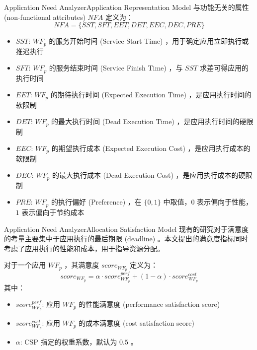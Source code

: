\documentclass[aspectratio=169]{beamer}
\begin{document}
\begin{frame}{Application Need Analyzer}{Application Representation Model}\label{label:non-functional-attributes}
  与功能无关的属性 (non-functional attributes) $NFA$ 定义为：
  \begin{equation*}
    NFA = \{SST, SFT, EET, DET, EEC, DEC, PRE\}
  \end{equation*}
  \begin{itemize}
    \item $SST$: $WF_p$ 的服务开始时间 (Service Start Time) ，用于确定应用立即执行或推迟执行
    \item $SFT$: $WF_p$ 的服务结束时间 (Service Finish Time) ，与 $SST$ 求差可得应用的执行时间
    \item $EET$: $WF_p$ 的期待执行时间 (Expected Execution Time) ，是应用执行时间的软限制
    \item $DET$: $WF_p$ 的最大执行时间 (Dead Execution Time) ，是应用执行时间的硬限制
    \item $EEC$: $WF_p$ 的期望执行成本 (Expected Execution Cost) ，是应用执行成本的软限制
    \item $DEC$: $WF_p$ 的最大执行成本 (Dead Execution Cost) ，是应用执行成本的硬限制
    \item $PRE$: $WF_p$ 的执行偏好 (Preference) ，在 $\{0,1\}$ 中取值，$0$ 表示偏向于性能，$1$ 表示偏向于节约成本
  \end{itemize}
  \hfill\hyperlink{label:sample-representation}{}
\end{frame}

\begin{frame}{Application Need Analyzer}{Allocation Satisfaction Model}
  现有的研究对于满意度的考量主要集中于应用执行的最后期限 (deadline) 。本文提出的满意度指标同时考虑了应用执行的性能和成本，用于指导资源分配。
  \pause
  \begin{definition}
    对于一个应用 $WF_p$ ，其满意度 $score_{WF_p}$ 定义为：
    \begin{equation*}
      score_{WF_p} = \alpha \cdot score_{WF_p}^{perf} + (1-\alpha) \cdot score_{WF_p}^{cost}
    \end{equation*}
    其中：
    \begin{itemize}
      \item $score_{WF_p}^{perf}$: 应用 $WF_p$ 的性能满意度 (performance satisfaction score)
      \item $score_{WF_p}^{cost}$: 应用 $WF_p$ 的成本满意度 (cost satisfaction score)
      \item $\alpha$: CSP 指定的权重系数，默认为 $0.5$ 。
    \end{itemize}
  \end{definition}
\end{frame}
\end{document}
